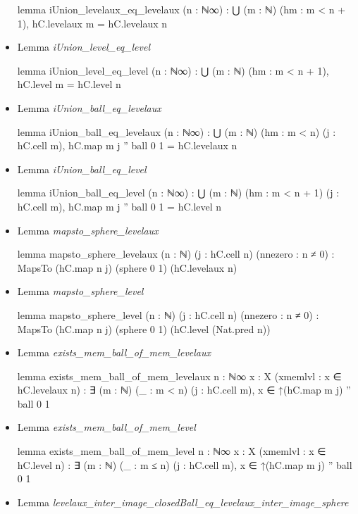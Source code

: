 \documentclass[colorinlistoftodos]{article}
\begin{document}
\begin{itemize}
\begin{leancode}
lemma iUnion_levelaux_eq_levelaux (n : ℕ∞) : 
  ⋃ (m : ℕ) (hm : m < n + 1), hC.levelaux m = hC.levelaux n
\end{leancode}
  \item Lemma \emph{iUnion\_level\_eq\_level}
\begin{leancode}
lemma iUnion_level_eq_level (n : ℕ∞) : ⋃ (m : ℕ) (hm : m < n + 1), hC.level m = hC.level n
\end{leancode}
  \item Lemma \emph{iUnion\_ball\_eq\_levelaux}
\begin{leancode}
lemma iUnion_ball_eq_levelaux (n : ℕ∞) :
  ⋃ (m : ℕ) (hm : m < n) (j : hC.cell m), hC.map m j '' ball 0 1 = hC.levelaux n
\end{leancode}
  \item Lemma \emph{iUnion\_ball\_eq\_level}
\begin{leancode}
lemma iUnion_ball_eq_level (n : ℕ∞) :
  ⋃ (m : ℕ) (hm : m < n + 1) (j : hC.cell m), hC.map m j '' ball 0 1 = hC.level n
\end{leancode}
  \item Lemma \emph{mapsto\_sphere\_levelaux}
\begin{leancode}
lemma mapsto_sphere_levelaux (n : ℕ) (j : hC.cell n) (nnezero : n ≠ 0) : 
  MapsTo (hC.map n j) (sphere 0 1) (hC.levelaux  n)
\end{leancode}
  \item Lemma \emph{mapsto\_sphere\_level}
\begin{leancode}
lemma mapsto_sphere_level (n : ℕ) (j : hC.cell n) (nnezero : n ≠ 0) : 
  MapsTo (hC.map n j) (sphere 0 1) (hC.level (Nat.pred n))
\end{leancode}
  \item Lemma \emph{exists\_mem\_ball\_of\_mem\_levelaux}
\begin{leancode}
lemma exists_mem_ball_of_mem_levelaux {n : ℕ∞} {x : X} (xmemlvl : x ∈ hC.levelaux n) : 
  ∃ (m : ℕ) (_ : m < n) (j : hC.cell m), x ∈ ↑(hC.map m j) '' ball 0 1
\end{leancode}
  \item Lemma \emph{exists\_mem\_ball\_of\_mem\_level}
\begin{leancode}
lemma exists_mem_ball_of_mem_level {n : ℕ∞} {x : X} (xmemlvl : x ∈ hC.level n) : 
  ∃ (m : ℕ) (_ : m ≤ n) (j : hC.cell m), x ∈ ↑(hC.map m j) '' ball 0 1
\end{leancode}
  \item Lemma \emph{levelaux\_inter\_image\_closedBall\_eq\_levelaux\_inter\_image\_sphere}

\end{itemize}
\end{document}
